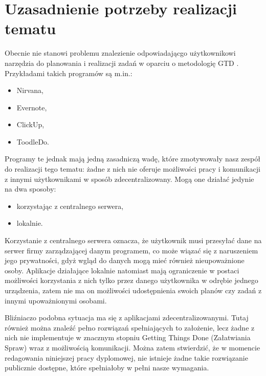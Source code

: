 \section{Uzasadnienie potrzeby realizacji tematu}
Obecnie nie stanowi problemu znalezienie odpowiadającgo użytkownikowi narzędzia do planowania i realizacji zadań w oparciu o metodologię GTD \cite{GTD-apps}. Przykładami takich programów są m.in.:
\begin{itemize}
    \item Nirvana,
    \item Evernote,
    \item ClickUp,
    \item ToodleDo.
\end{itemize}
Programy te jednak mają jedną zasadniczą wadę, które zmotywowały nasz zespół do realizacji tego tematu: żadne z nich nie oferuje możliwości pracy i komunikacji z innymi użytkownikami w sposób zdecentralizowany. Mogą one działać jedynie na dwa sposoby:
\begin{itemize}
    \item korzystając z centralnego serwera,
    \item lokalnie.
\end{itemize}
Korzystanie z centralnego serwera oznacza, że użytkownik musi przesyłać dane na serwer firmy zarządzającej danym programem, co może wiązać się z naruszeniem jego prywatności, gdyż wgląd do danych mogą mieć również nieupoważnione osoby. Aplikacje działające lokalnie natomiast mają ograniczenie w postaci możliwości korzystania z nich tylko przez danego użytkownika w odrębie jednego urządzenia, zatem nie ma on możliwości udostępnienia swoich planów czy zadań z innymi upoważnionymi osobami.
\par Bliźniaczo podobna sytuacja ma się z aplikacjami zdecentralizowanymi. Tutaj również można znaleźć pełno rozwiązań spełniających to założenie, lecz żadne z nich nie implementuje w znacznym stopniu Getting Things Done (Załatwiania Spraw) wraz z możliwością komunikacji. Można zatem stwierdzić, że w momencie redagowania niniejszej pracy dyplomowej, nie istnieje żadne takie rozwiązanie publicznie dostępne, które spełniałoby w pełni nasze wymagania.

